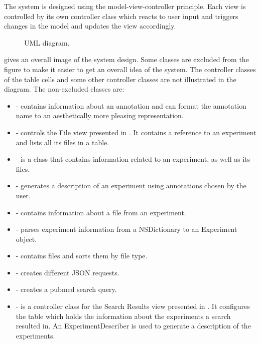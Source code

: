 The  system is designed using the model-view-controller principle. Each view is controlled by its own controller class which reacts to user input and triggers changes in the model and updates the view accordingly.
\begin{figure}[ht]
\caption{UML diagram.}
\label{fig:ios_UML}
\end{figure}
\FloatBarrier

 gives an overall image of the system design. Some classes are excluded from the figure to make it easier to get an overall idea of the system. The controller classes of the table cells and some other controller classes are not illustrated in the diagram. The non-excluded classes are:

\begin{itemize}

\item {} - contains information about an annotation and can format the annotation name to an aesthetically more pleasing representation.

\item {} - controls the File view presented in . It contains a reference to an experiment and lists all its files in a table.

\item {} - is a class that contains information related to an experiment, as well as its files.

\item {} - generates a description of an experiment using annotations chosen by the user.

\item {} - contains information about a file from an experiment.

\item {} - parses experiment information from a NSDictionary to an Experiment object.

\item {} - contains files and sorts them by file type.

\item {} - creates different JSON requests.

\item {} - creates a pubmed search query.

\item {} - is a controller class for the Search Results view presented in  . It configures the table which holds the information about the experiments a search resulted in. An ExperimentDescriber is used to generate a description of the experiments.


\end{itemize}
